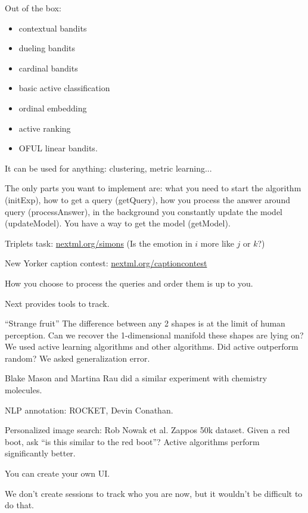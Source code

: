 Out of the box:
\begin{itemize}
\item
contextual bandits
\item
dueling bandits
\item 
cardinal bandits
\item
basic active classification
\item
ordinal embedding
\item
active ranking
\item
OFUL linear bandits.
\end{itemize}
It can be used for anything: clustering, metric learning...

The only parts you want to implement are: what you need to start the algorithm (initExp), how to get a query (getQuery), how you process the answer around query (processAnswer), in the background you constantly update the model (updateModel). You have a way to get the model (getModel). 

Triplets task: \url{nextml.org/simons} (Is the emotion in $i$ more like $j$ or $k$?) %

New Yorker caption contest: \url{nextml.org/captioncontest}

How you choose to process the queries and order them is up to you.

Next provides tools to track. 

``Strange fruit'' The difference between any 2 shapes is at the limit of human perception. Can we recover the 1-dimensional manifold these shapes are lying on? We used active learning algorithms and other algorithms.
Did active outperform random? We asked generalization error.

Blake Mason and Martina Rau did a similar experiment with chemistry molecules.

NLP annotation: ROCKET, Devin Conathan. 

Personalized image search: Rob Nowak et al. Zappos 50k dataset. Given a red boot, ask ``is this similar to the red boot''? Active algorithms perform significantly better. %

You can create your own UI.

We don't create sessions to track who you are now, but it wouldn't be difficult to do that.

